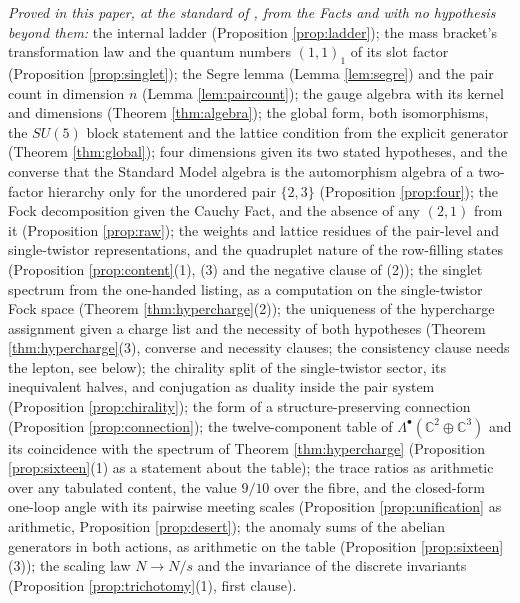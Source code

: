 \documentclass[11pt]{article}
\theoremstyle{definition}
\newcommand{\C}{\mathbb{C}}
\begin{document}
\emph{Proved in this paper, at the standard of \cite{ButlerT1}, from the Facts and with no hypothesis beyond them:} the internal ladder (Proposition \ref{prop:ladder}); the mass bracket's transformation law and the quantum numbers $(1,1)_{1}$ of its slot factor (Proposition \ref{prop:singlet}); the Segre lemma (Lemma \ref{lem:segre}) and the pair count in dimension $n$ (Lemma \ref{lem:paircount}); the gauge algebra with its kernel and dimensions (Theorem \ref{thm:algebra}); the global form, both isomorphisms, the $SU(5)$ block statement and the lattice condition from the explicit generator (Theorem \ref{thm:global}); four dimensions given its two stated hypotheses, and the converse that the Standard Model algebra is the automorphism algebra of a two-factor hierarchy only for the unordered pair $\{2, 3\}$ (Proposition \ref{prop:four}); the Fock decomposition given the Cauchy Fact, and the absence of any $(2,1)$ from it (Proposition \ref{prop:raw}); the weights and lattice residues of the pair-level and single-twistor representations, and the quadruplet nature of the row-filling states (Proposition \ref{prop:content}(1), (3) and the negative clause of (2)); the singlet spectrum from the one-handed listing, as a computation on the single-twistor Fock space (Theorem \ref{thm:hypercharge}(2)); the uniqueness of the hypercharge assignment given a charge list and the necessity of both hypotheses (Theorem \ref{thm:hypercharge}(3), converse and necessity clauses; the consistency clause needs the lepton, see below); the chirality split of the single-twistor sector, its inequivalent halves, and conjugation as duality inside the pair system (Proposition \ref{prop:chirality}); the form of a structure-preserving connection (Proposition \ref{prop:connection}); the twelve-component table of $\Lambda^{\bullet}(\C^{2} \oplus \C^{3})$ and its coincidence with the spectrum of Theorem \ref{thm:hypercharge} (Proposition \ref{prop:sixteen}(1) as a statement about the table); the trace ratios as arithmetic over any tabulated content, the value $9/10$ over the fibre, and the closed-form one-loop angle with its pairwise meeting scales (Proposition \ref{prop:unification} as arithmetic, Proposition \ref{prop:desert}); the anomaly sums of the abelian generators in both actions, as arithmetic on the table (Proposition \ref{prop:sixteen}(3)); the scaling law $N \to N/s$ and the invariance of the discrete invariants (Proposition \ref{prop:trichotomy}(1), first clause).
\end{document}
